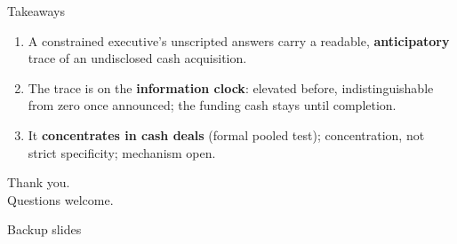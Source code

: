 \documentclass[aspectratio=169, 11pt]{beamer}
\begin{document}
\begin{frame}{Takeaways}
  \begin{enumerate}
    \item A constrained executive's unscripted answers carry a readable,
      \textbf{anticipatory} trace of an undisclosed cash acquisition.
    \item The trace is on the \textbf{information clock}: elevated before,
      indistinguishable from zero once announced; the funding cash stays
      until completion.
    \item It \textbf{concentrates in cash deals} (formal pooled test);
      concentration, not strict specificity; mechanism open.
  \end{enumerate}
  \vspace{1.2em}
  \begin{center}
    \Large Thank you.\\[0.4em]
    \normalsize Questions welcome.
  \end{center}
\end{frame}

\appendix

\begin{frame}
  \begin{center}\Huge Backup slides\end{center}
\end{frame}
\end{document}
